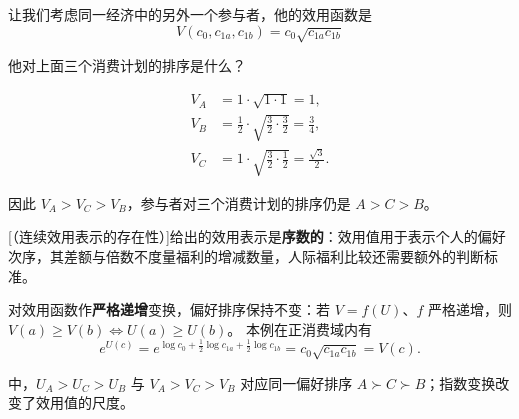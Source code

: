         \begin{tcolorbox}[example]
\begin{question}
            \quad 让我们考虑同一经济中的另外一个参与者，他的效用函数是
            \[
                V(c_0,c_{1a},c_{1b})=c_0\sqrt{c_{1a}c_{1b}}
            \]

            他对上面三个消费计划的排序是什么？
        \end{question}
        \begin{solution}
            \[
                \begin{aligned}
                    V_A &= 1\cdot\sqrt{1\cdot 1}=1,\\
                    V_B &= \tfrac12\cdot\sqrt{\tfrac32\cdot\tfrac32}=\tfrac34,\\
                    V_C &= 1\cdot\sqrt{\tfrac32\cdot\tfrac12}=\tfrac{\sqrt3}{2}.
                \end{aligned}
            \]

            因此 $V_A>V_C>V_B$，参与者对三个消费计划的排序仍是 $A>C>B$。
        \end{solution}
\end{tcolorbox}

\begin{tcolorbox}[knowledge,title=效用函数的序数性]
[（连续效用表示的存在性）]给出的效用表示是\textbf{序数的}：效用值用于表示个人的偏好次序，其差额与倍数不度量福利的增减数量，人际福利比较还需要额外的判断标准。

对效用函数作\textbf{严格递增}变换，偏好排序保持不变：若 $V=f(U)$、$f$ 严格递增，则 $V(a)\ge V(b)\iff U(a)\ge U(b)$。
\tcbline
本例在正消费域内有
\[
 e^{U(c)}=e^{\log c_0+\frac12\log c_{1a}+\frac12\log c_{1b}}
 =c_0\sqrt{c_{1a}c_{1b}}=V(c).
\]

 中，$U_A>U_C>U_B$ 与 $V_A>V_C>V_B$ 对应同一偏好排序 $A\succ C\succ B$；指数变换改变了效用值的尺度。
\end{tcolorbox}


